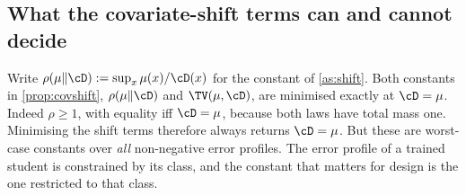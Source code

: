 \subsection{What the covariate-shift terms can and cannot decide}\label{sec:design-shift}

Write $\rho(\mu\|\cD):=\sup_x\mu(x)/\cD(x)$ for the constant of \cref{as:shift}. Both constants in
\cref{prop:covshift}, $\rho(\mu\|\cD)$ and $\TV(\mu,\cD)$, are minimised exactly at $\cD=\mu$.
Indeed $\rho\ge1$, with equality iff $\cD=\mu$, because both laws have total mass one. Minimising the
shift terms therefore always returns $\cD=\mu$. But these are worst-case constants over \emph{all}
non-negative error profiles. The error profile of a trained student is constrained by its class, and
the constant that matters for design is the one restricted to that class.

